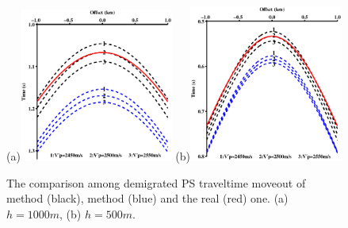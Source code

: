 \documentclass[extra,mreferee]{gji}
\newcommand{\Rome}[1]{{\bf\uppercase\expandafter{\romannumeral #1\relax}}}
\begin{document}
\begin{figure}
   \centering
   \subfigure(a){\includegraphics[width=0.45\textwidth]{PS_problem/h1000.eps}}
   \subfigure(b){\includegraphics[width=0.45\textwidth]{PS_problem/h500.eps}}
   \caption{The comparison among demigrated PS traveltime moveout of method \Rome{1} (black), method 
   \Rome{2} (blue) and the real (red) one.
   (a) $h=1000m$, (b) $h=500m$.}
   \label{fig:Sens_vp}
\end{figure}
\end{document}
